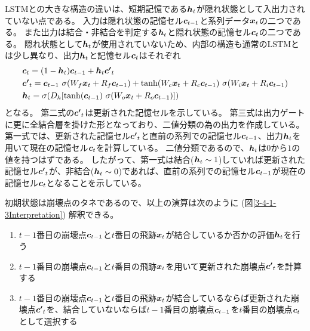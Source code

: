 LSTMとの大きな構造の違いは、短期記憶である${\mbox{\boldmath{$h$}}}_t$が隠れ状態として入出力されていない点である。
入力は隠れ状態の記憶セル${\mbox{\boldmath{$c$}}}_{t-1}$と系列データ${\mbox{\boldmath{$x$}}}_t$の二つである。
また出力は結合・非結合を判定する${\mbox{\boldmath{$h$}}}_t$と隠れ状態の記憶セル${\mbox{\boldmath{$c$}}}_{t}$の二つである。
隠れ状態として${\mbox{\boldmath{$h$}}}_t$が使用されていないため、内部の構造も通常のLSTMとは少し異なり、出力${\mbox{\boldmath{$h$}}}_{t}$と記憶セル${\mbox{\boldmath{$c$}}}_{t}$はそれぞれ
\begin{equation}
 \begin{split}
  &{\mbox{\boldmath{$c$}}}_{t} 
  = (1-{\mbox{\boldmath{$h$}}}_t) {\mbox{\boldmath{$c$}}}_{t-1} + {\mbox{\boldmath{$h$}}}_t {\mbox{\boldmath{$c'$}}}_{t}\\
  &{\mbox{\boldmath{$c'$}}}_{t}
  = {\mbox{\boldmath{$c$}}}_{t-1} \  \sigma (W_f {\mbox{\boldmath{$x$}}}_t + R_f {\mbox{\boldmath{$c$}}}_{t-1}) 
  + \tanh (W_c {\mbox{\boldmath{$x$}}}_t + R_c {\mbox{\boldmath{$c$}}}_{t-1}) \  \sigma (W_i {\mbox{\boldmath{$x$}}}_t + R_i {\mbox{\boldmath{$c$}}}_{t-1})\\
  &{\mbox{\boldmath{$h$}}}_{t} 
  = \sigma (D_h [\tanh({\mbox{\boldmath{$c$}}}_{t-1}) \  \sigma (W_o {\mbox{\boldmath{$x$}}}_t + R_o {\mbox{\boldmath{$c$}}}_{t-1}) ])
 \end{split}
\end{equation}
となる。
第二式の${\mbox{\boldmath{$c'$}}}_{t}$は更新された記憶セルを示している。
第三式は出力ゲートに更に全結合層を掛けた形となっており、二値分類の為の出力を作成している。
第一式では、更新された記憶セル${\mbox{\boldmath{$c'$}}}_{t}$と直前の系列での記憶セル${\mbox{\boldmath{$c$}}}_{t-1}$、出力${\mbox{\boldmath{$h$}}}_{t}$を用いて現在の記憶セル${\mbox{\boldmath{$c$}}}_{t}$を計算している。
二値分類であるので、${\mbox{\boldmath{$h$}}}_{t}$は$0$から$1$の値を持つはずである。
したがって、第一式は結合(${\mbox{\boldmath{$h$}}}_{t} \sim 1$)していれば更新された記憶セル${\mbox{\boldmath{$c'$}}}_{t}$が、非結合(${\mbox{\boldmath{$h$}}}_{t} \sim 0$)であれば、直前の系列での記憶セル${\mbox{\boldmath{$c$}}}_{t-1}$が現在の記憶セル${\mbox{\boldmath{$c$}}}_{t}$となることを示している。

初期状態は崩壊点のタネであるので、以上の演算は次のように (図\ref{3-4-1-3Interpretation}) 解釈できる。

\begin{enumerate}
 \item $t-1$番目の崩壊点${\mbox{\boldmath{$c$}}}_{t-1}$と$t$番目の飛跡${\mbox{\boldmath{$x$}}}_{t}$が結合しているか否かの評価${\mbox{\boldmath{$h$}}}_{t}$を行う
 \item $t-1$番目の崩壊点${\mbox{\boldmath{$c$}}}_{t-1}$と$t$番目の飛跡${\mbox{\boldmath{$x$}}}_{t}$を用いて更新された崩壊点${\mbox{\boldmath{$c'$}}}_{t}$を計算する
 \item $t-1$番目の崩壊点${\mbox{\boldmath{$c$}}}_{t-1}$と$t$番目の飛跡${\mbox{\boldmath{$x$}}}_{t}$が結合しているならば更新された崩壊点${\mbox{\boldmath{$c'$}}}_{t}$を、結合していないならば$t-1$番目の崩壊点${\mbox{\boldmath{$c$}}}_{t-1}$を$t$番目の崩壊点${\mbox{\boldmath{$c$}}}_{t}$として選択する
\end{enumerate}

